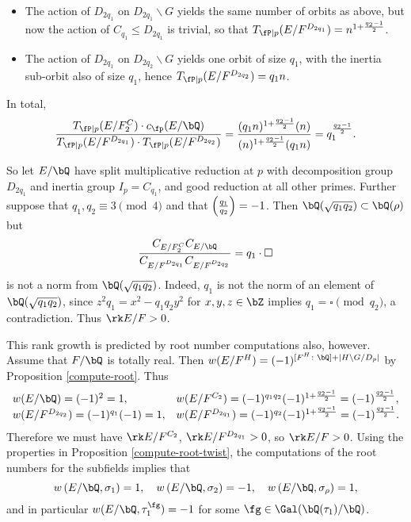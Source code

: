\begin{example}[Dihedral]
\begin{itemize}[--]
            \item The action of $D_{2 q_1}$ on $D_{2 q_1} \backslash G$ yields the same number of orbits as above, but now the action of $C_{q_1} \leq D_{2 q_1}$ is trivial, so that $T_{\fP \mid p}(E / F^{D_{2 q_1}}) = n^{1 + \frac{q_2 - 1}{2}}$.
            
            \item The action of $D_{2 q_1}$ on $D_{2 q_2} \backslash G$ yields one orbit of size $q_1$, with the inertia sub-orbit also of size $q_1$, hence $T_{\fP \mid p}(E / F^{D_{2 q_2}}) = q_1 n$.
        \end{itemize}
    In total,
    \[ \frac{T_{\fP \mid p}(E / F^C_2) \cdot c_{\fp}(E / \bQ)}{T_{\fP \mid p}(E / F^{D_{2 q_1}})\cdot T_{\fP \mid p}(E / F^{D_{2 q_2}})} = \frac{(q_1 n )^{1 + \frac{q_2 - 1}{2}} (n)}{(n)^{1 + \frac{q_2 - 1}{2}} (q_1 n)} = q_1^{\frac{q_2 - 1}{2}} .\] 

    So let $E / \bQ$ have split multiplicative reduction at $p$ with decomposition group $D_{2 q_1}$ and inertia group $I_p = C_{q_1}$, and good reduction at all other primes. Further suppose that $q_1, q_2 \equiv 3 \pmod 4$ and that $\left( \frac{q_1}{q_2} \right)  = -1$. Then $\bQ(\sqrt{q_1 q_2}) \subset \bQ(\rho)$ but 
$$\frac{C_{E / F^C_2} C_{E / \bQ}}{C_{E / F^{D_{2 q_1}}} C_{E / F^{D_{2 q_2}}}} = q_1 \cdot \square$$
is not a norm from $\bQ(\sqrt{q_1 q_2})$. Indeed, $q_1$ is not the norm of an element of $\bQ(\sqrt{q_1 q_2})$, since $z^2 q_1 = x^2 - q_1q_2 y^2$ for $x,y,z \in \bZ$ implies $q_1 = \square \pmod {q_2}$, a contradiction. Thus $\rk E / F > 0$.

    This rank growth is predicted by root number computations also, however. Assume that $F / \bQ$ is totally real. Then $w(E / F^H) = (-1)^{[F^H \colon \bQ] + | H \backslash G / D_p|}$ by Proposition \ref{compute-root}. Thus
    \[
    \begin{array}{l l}
    w(E / \bQ) = (-1)^2 = 1, & w(E / F^{C_2}) = (-1)^{q_1 q_2} (-1)^{1 + \frac{q_2 - 1}{2}} = (-1)^{\frac{q_2 - 1}{2}}, \\
    w(E / F^{D_{2 q_2}}) = (-1)^{q_1}(-1) = 1, & w(E / F^{D_{2 q_1}}) = (-1)^{q_2}(-1)^{1 + \frac{q_2 - 1}{2}} = (-1)^{\frac{q_2 - 1}{2}}.
    \end{array}
    \]
    Therefore we must have $\rk E / F^{C_2}$, $\rk E / F^{D_{2q_1}} > 0$, so $\rk E / F > 0$. 
    Using the properties in Proposition \ref{compute-root-twist}, the computations of the root numbers for the subfields implies that 
    \[ w\left(E / \bQ, \sigma_1\right) = 1, \quad w\left(E / \bQ, \sigma_2\right) = -1, \quad w\left(E / \bQ, \sigma_{\rho}\right) = 1, \]
  and in particular $w(E / \bQ, \tau_1^{\fg}) = -1$ for some $\fg \in \Gal(\bQ(\tau_1) / \bQ)$.
\end{example}

